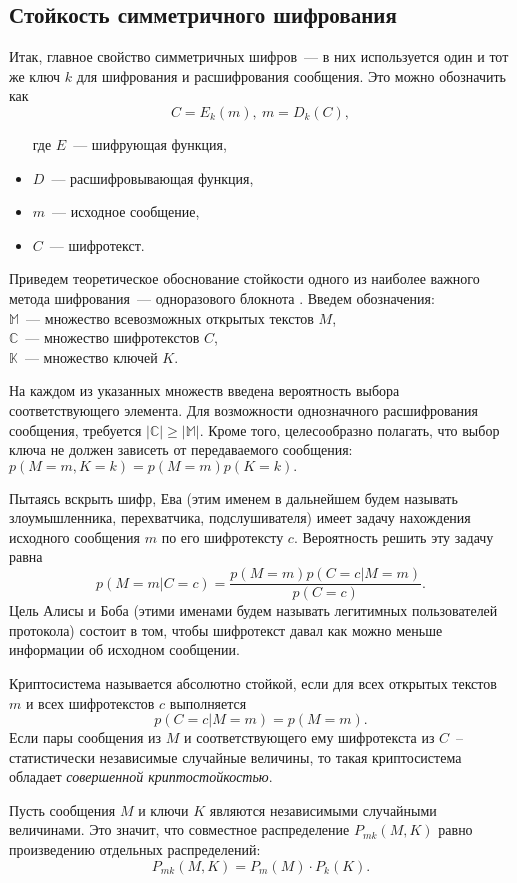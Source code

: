 \subsection{Стойкость симметричного шифрования}
Итак, главное свойство симметричных шифров~--- в них используется один и тот же ключ $k$ для шифрования и расшифрования сообщения.
Это можно обозначить как $$ C = E_k(m),\ m = D_k(C), $$
\begin{itemize}
  \item[где] $E$~--- шифрующая функция,
  \item $D$~--- расшифровывающая функция,
  \item $m$~--- исходное сообщение,
  \item $C$~--- шифротекст.
\end{itemize}

Приведем теоретическое обоснование стойкости одного из наиболее важного метода шифрования~--- одноразового блокнота \cite{vernam_cryptosystem}.
Введем обозначения: \\
$ \mathbb{M}$~--- множество всевозможных открытых текстов $M$, \\
$ \mathbb{C}$~--- множество шифротекстов $C$, \\
$ \mathbb{K}$~--- множество ключей $K$.

На каждом из указанных множеств введена вероятность выбора соответствующего элемента.
Для возможности однозначного расшифрования сообщения, требуется $|\mathbb{C}| \ge |\mathbb{M}|.$
Кроме того, целесообразно полагать, что выбор ключа не должен зависеть от передаваемого сообщения: $p(M = m, K = k) = p(M = m) p(K = k).$

Пытаясь вскрыть шифр, Ева (этим именем в дальнейшем будем называть злоумышленника, перехватчика, подслушивателя) имеет задачу нахождения исходного сообщения $m$ по его шифротексту $c$. Вероятность решить эту задачу равна
$$ p(M = m | C = c) = \frac{p(M = m) p(C = c|M = m)}{p(C = c)}. $$
Цель Алисы и Боба (этими именами будем называть легитимных пользователей протокола) состоит в том, чтобы шифротекст давал как можно меньше информации об исходном сообщении.

Криптосистема называется абсолютно стойкой, если для всех открытых текстов $m$ и всех шифротекстов $c$ выполняется
$$ p(C = c|M = m) = p(M = m). $$
Если пары сообщения из $M$ и соответствующего ему шифротекста из $C$~-- статистически независимые случайные величины, 
то такая криптосистема обладает \textit{совершенной криптостойкостью}. 

Пусть сообщения $M$ и ключи $K$ являются независимыми случайными величинами. Это значит, что совместное распределение $P_{mk}(M, K)$ равно произведению отдельных распределений:
$$P_{mk}(M, K) = P_m(M) \cdot P_k(K).$$

